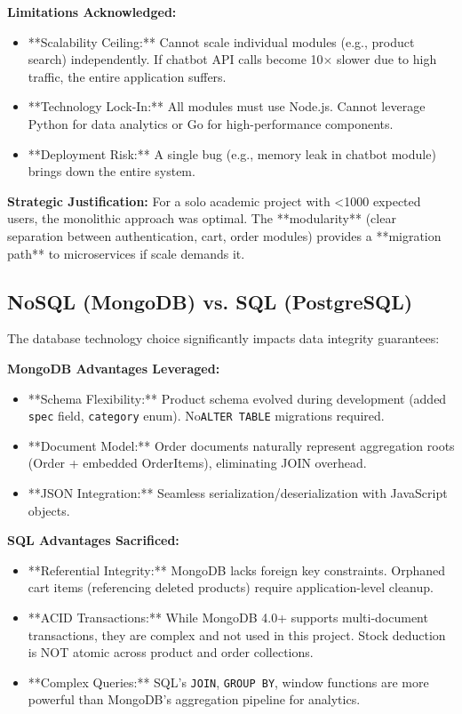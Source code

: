 \documentclass[12pt, a4paper]{report}
\begin{document}
\textbf{Limitations Acknowledged:}
\begin{itemize}
    \item **Scalability Ceiling:** Cannot scale individual modules (e.g., product search) independently. If chatbot API calls become 10$\times$ slower due to high traffic, the entire application suffers.
    \item **Technology Lock-In:** All modules must use Node.js. Cannot leverage Python for data analytics or Go for high-performance components.
    \item **Deployment Risk:** A single bug (e.g., memory leak in chatbot module) brings down the entire system.
\end{itemize}

\textbf{Strategic Justification:} For a solo academic project with \textless 1000 expected users, the monolithic approach was optimal. The **modularity** (clear separation between authentication, cart, order modules) provides a **migration path** to microservices if scale demands it.

\subsection{NoSQL (MongoDB) vs. SQL (PostgreSQL)}

The database technology choice significantly impacts data integrity guarantees:

\textbf{MongoDB Advantages Leveraged:}
\begin{itemize}
    \item **Schema Flexibility:** Product schema evolved during development (added \texttt{spec} field, \texttt{category} enum). No\texttt{ALTER TABLE} migrations required.
    \item **Document Model:** Order documents naturally represent aggregation roots (Order + embedded OrderItems), eliminating JOIN overhead.
    \item **JSON Integration:** Seamless serialization/deserialization with JavaScript objects.
\end{itemize}

\textbf{SQL Advantages Sacrificed:}
\begin{itemize}
    \item **Referential Integrity:** MongoDB lacks foreign key constraints. Orphaned cart items (referencing deleted products) require application-level cleanup.
    \item **ACID Transactions:** While MongoDB 4.0+ supports multi-document transactions, they are complex and not used in this project. Stock deduction is NOT atomic across product and order collections.
    \item **Complex Queries:** SQL's \texttt{JOIN}, \texttt{GROUP BY}, window functions are more powerful than MongoDB's aggregation pipeline for analytics.
\end{itemize}
\end{document}
